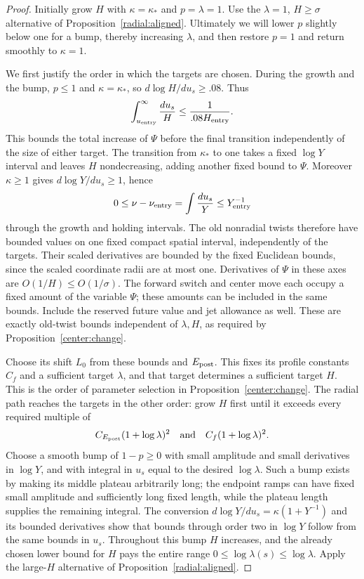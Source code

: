 \begin{proof}
Initially grow $H$ with $\kappa=\kappa_*$ and $p=\lambda=1$.
Use the $\lambda=1$, $H\geq\sigma$ alternative of
Proposition~\ref{radial:aligned}. Ultimately we will lower $p$
slightly below one for a bump, thereby increasing $\lambda$, and
then restore $p=1$ and return smoothly to $\kappa=1$.

We first justify the order in which the targets are chosen.
During the growth and the bump, $p\leq1$ and $\kappa=\kappa_*$,
so $d\log H/du_s\geq.08$. Thus
\[
 \int_{u_{\rm entry}}^\infty \frac{du_s}{H}
 \leq \frac{1}{.08H_{\rm entry}}.
\]
This bounds the total increase of $\Psi$ before the final transition
independently of the size of either target. The transition from
$\kappa_*$ to one takes a fixed $\log Y$ interval and leaves
$H$ nondecreasing, adding another fixed bound to $\Psi$.
Moreover $\kappa\geq1$ gives
$d\log Y/du_s\geq1$, hence
\[
 0\leq\nu-\nu_{\rm entry}
 =\int \frac{du_s}{Y}\leq Y_{\rm entry}^{-1}
\]
through the growth and holding intervals. The old nonradial
twists therefore have bounded values on one fixed compact
spatial interval, independently of the targets. Their scaled
derivatives are bounded by the fixed Euclidean bounds, since
the scaled coordinate radii are at most one. Derivatives of
$\Psi$ in these axes are $O(1/H)\leq O(1/\sigma)$.
The forward switch and center move each occupy a fixed amount
of the variable $\Psi$; these amounts can be included in the
same bounds. Include the reserved future value and jet allowance
as well. These are exactly old-twist bounds independent of
$\lambda,H$, as required by Proposition~\ref{center:change}.

Choose its shift $L_0$ from these bounds and $E_{\rm post}$.
This fixes its profile constants $C_f$ and a sufficient target
$\lambda$, and that target determines a sufficient target $H$.
This is the order of parameter selection in
Proposition~\ref{center:change}. The radial path reaches the targets
in the other order: grow $H$ first until it exceeds every required
multiple of
\[
 C_{E_{\rm post}}(1+\log\lambda)^2
 \quad\hbox{and}\quad C_f(1+\log\lambda)^2.
\]
Choose a smooth bump of $1-p\geq0$ with small amplitude and
small derivatives in $\log Y$, and with integral in $u_s$
equal to the desired $\log\lambda$. Such a bump exists by
making its middle plateau arbitrarily long; the endpoint ramps
can have fixed small amplitude and sufficiently long fixed
length, while the plateau length supplies the remaining integral.
The conversion $d\log Y/du_s=\kappa(1+Y^{-1})$ and its bounded
derivatives show that bounds through order two in $\log Y$
follow from the same bounds in $u_s$.
Throughout this bump $H$ increases, and the already chosen lower
bound for $H$ pays the entire range $0\leq\log\lambda(s)\leq
\log\lambda$. Apply the large-$H$ alternative of
Proposition~\ref{radial:aligned}.


\end{proof}
